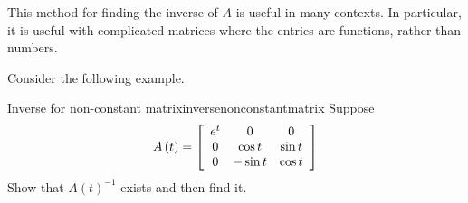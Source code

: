 %
%
%

This method for finding the inverse of $A$ is useful in many contexts. In particular, it 
is useful with complicated matrices where the entries are functions, rather than numbers.

Consider the following example. 

\begin{example}{Inverse for non-constant matrix}{inversenonconstantmatrix}
Suppose
\begin{equation*}
A\left( t\right) =\left[
\begin{array}{ccc}
e^{t} & 0 & 0 \\
0 & \cos t & \sin t \\
0 & -\sin t & \cos t
\end{array}
\right]
\end{equation*}
Show that $A\left( t\right) ^{-1}$ exists and then find it.
\end{example}


